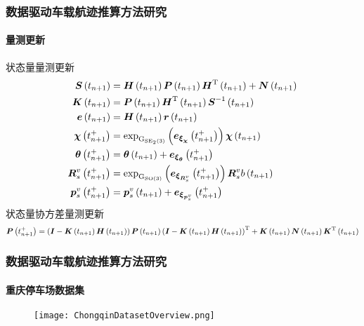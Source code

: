 \begin{frame}

	\frametitle{数据驱动车载航迹推算方法研究}	
	\framesubtitle{量测更新}
	\vspace{-0.2cm}
	{\small
		状态量量测更新
	}
	{\scriptsize
		\begin{align*}
	    	\vb*{S}\left(t_{n+1}\right) &= \vb*{H}\left(t_{n+1}\right) \vb*{P}\left(t_{n+1}\right) \vb*{H}^{\mathrm{T}}\left(t_{n+1}\right) + \vb*{N}\left(t_{n+1}\right) \\
	    	\vb*{K}\left(t_{n+1}\right) &= \vb*{P}\left(t_{n+1}\right) \vb*{H}^{\mathrm{T}}\left(t_{n+1}\right) \vb*{S}^{-1}\left(t_{n+1}\right) \\
		    \vb*{e}\left(t_{n+1}\right) &= \vb*{H}\left(t_{n+1}\right) \vb*{r}\left(t_{n+1}\right) \\
			\vb*{\chi}\left(t_{n+1}^+\right)   &= \exp_{\mathrm{G}_{\mathrm{SE}_2\left(3\right)}}\left( \vb*{e}_{\vb*{\xi}_{\vb*{\chi}}}\left(t_{n+1}^+\right) \right) \vb*{\chi}\left(t_{n+1}\right)\\
			\vb*{\theta}\left(t_{n+1}^+\right) &= \vb*{\theta}\left(t_{n+1}\right) + \vb*{e}_{\vb*{\xi}_{\vb*{\theta}}}\left(t_{n+1}^+\right) \\
			\vb*{R}_s^v\left(t_{n+1}^+\right)  &= \exp_{\mathrm{G}_{\mathrm{SO}\left(3\right)}}\left( \vb*{e}_{\vb*{\xi}_{\vb*{R}_s^v}}\left(t_{n+1}^+\right) \right) \vb*{R}_s^vb\left(t_{n+1}\right) \\
			\vb*{p}_s^v\left(t_{n+1}^+\right)  &= \vb*{p}_s^v\left(t_{n+1}\right) + \vb*{e}_{\vb*{\xi}_{\vb*{p}_s^v}}\left(t_{n+1}^+\right)
		\end{align*}
	}
	{\small		
		状态量协方差量测更新
	}
	{\scriptsize
		\begin{equation*}
			\vb*{P}\left(t_{n+1}^+\right) = \left(\vb*{I} - \vb*{K}\left(t_{n+1}\right)\vb*{H}\left(t_{n+1}\right)\right) \vb*{P}\left(t_{n+1}\right) \left(\vb*{I} - \vb*{K}\left(t_{n+1}\right)\vb*{H}\left(t_{n+1}\right)\right)^{\mathrm{T}} + \vb*{K}\left(t_{n+1}\right)\vb*{N}\left(t_{n+1}\right) \vb*{K}^{\mathrm{T}}\left(t_{n+1}\right)
		\end{equation*}
	}
 
\end{frame}

\begin{frame} 
 	\frametitle{数据驱动车载航迹推算方法研究}
 	\framesubtitle{重庆停车场数据集}
   	\begin{figure}
   	\centering
	    \texttt{[image: ChongqinDatasetOverview.png]}
   	\end{figure}  
\end{frame}

